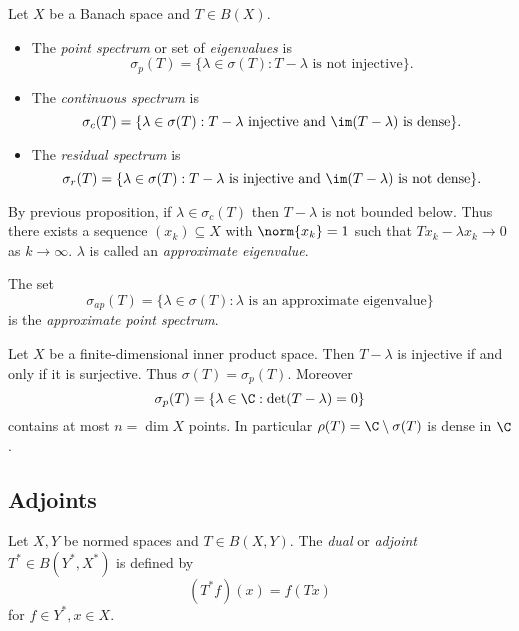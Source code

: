 \documentclass[a4paper]{article}
\begin{document}
\begin{definition}
  Let \(X\) be a Banach space and \(T \in B(X)\).
  \begin{itemize}
  \item The \emph{point spectrum} or set of \emph{eigenvalues} is
    \[
      \sigma_p(T) = \{\lambda \in \sigma(T): T - \lambda \text{ is not injective}\}.
    \]
  \item The \emph{continuous spectrum} is
    \[
      \sigma_c(T) = \{\lambda \in \sigma(T): T - \lambda \text{ injective and } \im (T - \lambda) \text{ is dense}\}.
    \]
  \item The \emph{residual spectrum} is
    \[
      \sigma_r(T) = \{\lambda \in \sigma(T): T - \lambda \text{ is injective and } \im (T - \lambda) \text{ is not dense}\}.
    \]
  \end{itemize}
\end{definition}

\begin{remark}
  By previous proposition, if \(\lambda \in \sigma_c(T)\) then \(T - \lambda\) is not bounded below. %
  Thus there exists a sequence \((x_k) \subseteq X\) with \(\norm{x_k} = 1\) such that \(T x_k - \lambda x_k \to 0\) as \(k \to \infty\). \(\lambda\) is called an \emph{approximate eigenvalue}.

  The set
  \[
    \sigma_{ap}(T) = \{\lambda \in \sigma(T): \lambda \text{ is an approximate eigenvalue}\}
  \]
  is the \emph{approximate point spectrum}.
\end{remark}

\begin{eg}
  Let \(X\) be a finite-dimensional inner product space. Then \(T - \lambda\) is injective if and only if it is surjective. Thus \(\sigma(T) = \sigma_p(T)\). Moreover
  \[
    \sigma_p(T) = \{\lambda \in \C: \det(T - \lambda) = 0\}
  \]
  contains at most \(n = \dim X\) points. In particular \(\rho(T) = \C \setminus \sigma(T)\) is dense in \(\C\).
\end{eg}

\subsection{Adjoints}

\begin{definition}
  Let \(X, Y\) be normed spaces and \(T \in B(X, Y)\). The \emph{dual} or \emph{adjoint} \(T^* \in B(Y^*, X^*)\) is defined by
  \[
    (T^*f)(x) = f(Tx)
  \]
  for \(f \in Y^*, x \in X\).
\end{definition}
\end{document}

